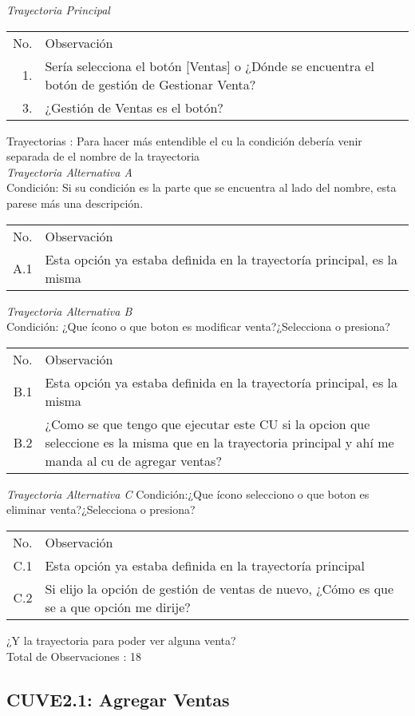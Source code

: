 \documentclass[10pt,spanish]{article}
\providecommand{\tabularnewline}{\\}
\begin{document}
\textit{\large Trayectoria Principal}{\large {} }{\large \par}

\begin{longtable}{rp{8cm}}
No.  & Observación\tabularnewline
1.  & Sería selecciona el botón {[}Ventas{]} o ¿Dónde se encuentra el botón de gestión de Gestionar Venta?\tabularnewline
3.  & ¿Gestión de Ventas es el botón?\tabularnewline
\end{longtable}

Trayectorias : Para hacer más entendible el cu la condición debería venir separada de el nombre de la trayectoria\tabularnewline
\textit{Trayectoria Alternativa A}\tabularnewline
Condición: Si su condición es la parte que se encuentra al lado del nombre, esta parese más una descripción.\tabularnewline
\begin{longtable}{rp{8cm}}
No.  & Observación\tabularnewline
A.1  & Esta opción ya estaba definida en la trayectoría principal, es la misma\tabularnewline
\end{longtable}
\textit{Trayectoria Alternativa B}\tabularnewline
Condición: ¿Que ícono o que boton es modificar venta?¿Selecciona o presiona?
\begin{longtable}{rp{8cm}}
No.  & Observación\tabularnewline
B.1  & Esta opción ya estaba definida en la trayectoría principal, es la misma\tabularnewline
B.2  & ¿Como se que tengo que ejecutar este CU si la opcion que seleccione es la misma que en la trayectoria principal y ahí me manda al cu de agregar ventas?\tabularnewline
\end{longtable}%

\textit{Trayectoria Alternativa C}
Condición:¿Que ícono selecciono o que boton es eliminar venta?¿Selecciona o presiona?
\begin{longtable}{rp{8cm}}
No.  & Observación\tabularnewline
C.1  &Esta opción ya estaba definida en la trayectoría principal\tabularnewline
C.2  & Si elijo la opción de gestión de ventas de nuevo, ¿Cómo es que se a que opción me dirije?
\end{longtable}
¿Y la trayectoria para poder ver alguna venta?\tabularnewline
Total de Observaciones : 18\tabularnewline
\newpage{} 
\subsection{CUVE2.1: Agregar Ventas}
\end{document}
